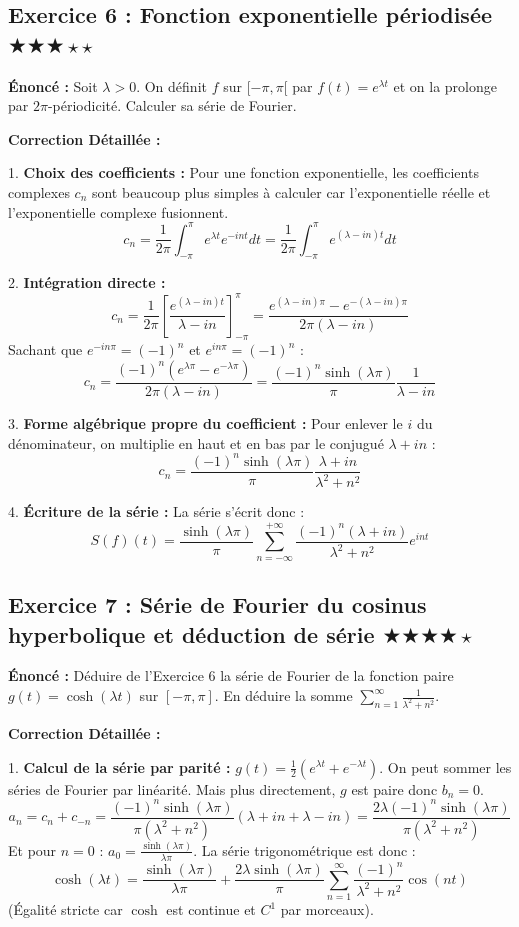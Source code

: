 \documentclass[11pt,a4paper]{article}
\begin{document}
\subsection*{Exercice 6 : Fonction exponentielle périodisée \quad $\bigstar\bigstar\bigstar\star\star$}

\textbf{Énoncé :}
Soit $\lambda > 0$. On définit $f$ sur $[-\pi, \pi[$ par $f(t) = e^{\lambda t}$ et on la prolonge par $2\pi$-périodicité. Calculer sa série de Fourier.

\textbf{Correction Détaillée :}

1. \textbf{Choix des coefficients :}
   Pour une fonction exponentielle, les coefficients complexes $c_n$ sont beaucoup plus simples à calculer car l'exponentielle réelle et l'exponentielle complexe fusionnent.
   $$ c_n = \frac{1}{2\pi} \int_{-\pi}^\pi e^{\lambda t} e^{-int} dt = \frac{1}{2\pi} \int_{-\pi}^\pi e^{(\lambda - in)t} dt $$

2. \textbf{Intégration directe :}
   $$ c_n = \frac{1}{2\pi} \left[ \frac{e^{(\lambda - in)t}}{\lambda - in} \right]_{-\pi}^\pi = \frac{e^{(\lambda - in)\pi} - e^{-(\lambda - in)\pi}}{2\pi(\lambda - in)} $$
   Sachant que $e^{-in\pi} = (-1)^n$ et $e^{in\pi} = (-1)^n$ :
   $$ c_n = \frac{(-1)^n (e^{\lambda\pi} - e^{-\lambda\pi})}{2\pi(\lambda - in)} = \frac{(-1)^n \sinh(\lambda\pi)}{\pi} \frac{1}{\lambda - in} $$

3. \textbf{Forme algébrique propre du coefficient :}
   Pour enlever le $i$ du dénominateur, on multiplie en haut et en bas par le conjugué $\lambda + in$ :
   $$ c_n = \frac{(-1)^n \sinh(\lambda\pi)}{\pi} \frac{\lambda + in}{\lambda^2 + n^2} $$

4. \textbf{Écriture de la série :}
   La série s'écrit donc :
   $$ S(f)(t) = \frac{\sinh(\lambda\pi)}{\pi} \sum_{n=-\infty}^{+\infty} \frac{(-1)^n (\lambda + in)}{\lambda^2 + n^2} e^{int} $$


\subsection*{Exercice 7 : Série de Fourier du cosinus hyperbolique et déduction de série \quad $\bigstar\bigstar\bigstar\bigstar\star$}

\textbf{Énoncé :}
Déduire de l'Exercice 6 la série de Fourier de la fonction paire $g(t) = \cosh(\lambda t)$ sur $[-\pi, \pi]$. En déduire la somme $\sum_{n=1}^\infty \frac{1}{\lambda^2 + n^2}$.

\textbf{Correction Détaillée :}

1. \textbf{Calcul de la série par parité :}
   $g(t) = \frac{1}{2}(e^{\lambda t} + e^{-\lambda t})$. On peut sommer les séries de Fourier par linéarité.
   Mais plus directement, $g$ est paire donc $b_n = 0$.
   $$ a_n = c_n + c_{-n} = \frac{(-1)^n \sinh(\lambda\pi)}{\pi(\lambda^2 + n^2)} (\lambda + in + \lambda - in) = \frac{2\lambda (-1)^n \sinh(\lambda\pi)}{\pi(\lambda^2 + n^2)} $$
   Et pour $n=0$ : $a_0 = \frac{\sinh(\lambda\pi)}{\lambda\pi}$.
   La série trigonométrique est donc :
   $$ \cosh(\lambda t) = \frac{\sinh(\lambda\pi)}{\lambda\pi} + \frac{2\lambda\sinh(\lambda\pi)}{\pi} \sum_{n=1}^\infty \frac{(-1)^n}{\lambda^2 + n^2} \cos(nt) $$
   (Égalité stricte car $\cosh$ est continue et $C^1$ par morceaux).
\end{document}
